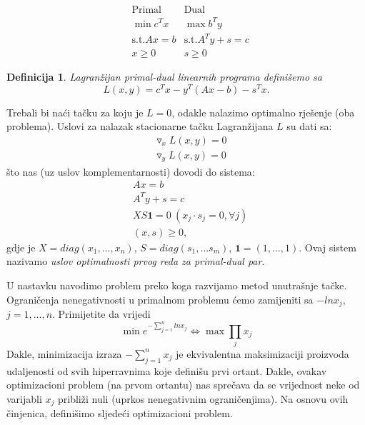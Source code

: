 \documentclass[a4paper, utf8, 11pt, colorlinks]{book}
\newtheorem{definition}{Definicija}
\begin{document}
$$ \begin{array}{lll}
	&\mbox{Primal}            & \mbox{Dual}     \\
	&\min  c^T x              & \max  b^T y \\
	& \mbox{s.t.} Ax = b      &   \mbox{s.t.} A^Ty + s = c \\
	& x \geq 0                &   s \geq 0
\end{array}
$$
\begin{definition}
Lagranžijan primal-dual linearnih programa definišemo sa 
\begin{equation}
	L(x,y) = c^Tx - y^T(Ax - b) - s^T x.
\end{equation}
\end{definition}
Trebali bi naći tačku za koju je $L = 0$, odakle nalazimo optimalno rješenje (oba problema).  Uslovi za nalazak stacionarne tačku Lagranžijana $L$ su dati sa:
\begin{align}
	&\triangledown_x L(x,y) = 0\\
	&\triangledown_y L(x,y) = 0
\end{align} 
što nas (uz uslov komplementarnosti) dovodi do sistema:
\begin{align}
	&Ax = b \\
	&A^T y + s = c \\
	&XS\mathbf{1} = 0 \ (x_j \cdot s_j =0 , \forall j) \\
	&  (x, s ) \geq 0,
\end{align}
gdje je $X = diag (x_1, \ldots, x_n)$, $S= diag(s_1,\ldots s_m)$, $\mathbf{1}=(1,\ldots, 1)$. Ovaj sistem nazivamo \emph{uslov optimalnosti prvog reda za primal-dual par}. 

U nastavku navodimo problem preko koga razvijamo metod unutrašnje tačke. Ograničenja nenegativnosti u primalnom problemu ćemo zamijeniti sa $-ln x_j$, $j=1,\ldots,n$.   
Primijetite da vrijedi 
$$\min e^{-\sum_{j=1}^n ln x_j} \Leftrightarrow \max \prod_{j} x_j $$
Dakle, minimizacija izraza $-\sum_{j=1}^n x_j$ je ekvivalentna maksimizaciji proizvoda udaljenosti od svih hiperravnima koje definišu prvi ortant. Dakle, ovakav optimizacioni problem (na prvom ortantu) nas sprečava da se vrijednost neke od varijabli $x_j$ približi nuli (uprkos nenegativnim ograničenjima).  Na osnovu ovih činjenica, definišimo sljedeći optimizacioni problem. 
\end{document}
